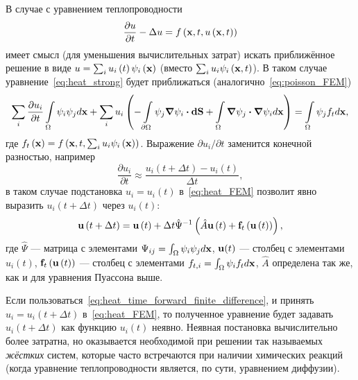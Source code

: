 \documentclass[oneside,final,12pt]{extreport}
\newcommand\bcdot[0]{\boldsymbol\cdot}
\begin{document}
В случае с уравнением теплопроводности
\begin{equation}
  \frac{\partial u}{\partial t} - \Delta u =
    f\left(\vb x, t, u\left(\vb x, t\right)\right)
\label{eq:heat_strong}
\end{equation}
имеет смысл (для уменьшения вычислительных затрат)
искать приближённое решение в виде
$u = \sum_i u_i\left(t\right)\psi_i\left(\vb x\right)$
(вместо $\sum_i u_i\psi_i\left(\vb x, t\right)$).
В таком случае уравнение~\eqref{eq:heat_strong} будет приближаться
(аналогично~\eqref{eq:poisson_FEM})
\begin{equation}
  \sum_i \frac{\partial u_i}{\partial t} \int\limits_\Omega \psi_i\psi_j d\vb x +
    \sum_i u_i \left(
      -\int\limits_{\partial\Omega} \psi_j \grad \psi_i \bcdot \vb{dS} +
      \int\limits_\Omega \grad\psi_j \bcdot \grad \psi_i d\vb x
    \right) =
  \int\limits_\Omega \psi_j f_t d\vb x,
\label{eq:heat_FEM}
\end{equation}
где $f_t\left(\vb x\right) =
  f\left(\vb x, t, \sum_i u_i\psi_i\left(\vb x\right)\right)$.
Выражение $\partial u_i/\partial t$ заменится конечной разностью, например
\begin{equation}
  \frac{\partial u_i}{\partial t} \approx
    \frac{u_i\left(t + \Delta t\right) - u_i\left(t\right)}{\Delta t},
\label{eq:heat_time_forward_finite_difference}
\end{equation}
в таком случае подстановка $u_i = u_i\left(t\right)$ в~\eqref{eq:heat_FEM}
позволит явно выразить $u_i\left(t + \Delta t\right)$ через $u_i\left(t\right)$:
\begin{equation}
  \vb u\left(t + \Delta t\right) =
    \vb u\left(t\right) +
      \Delta t\hat{\Psi}^{-1} \left(\hat{A}\vb u\left(t\right) +
                                    \vb f_t\left(\vb u\left(t\right)\right)\right),
\label{eq:heat_FEM_explicit}
\end{equation}
где $\hat{\Psi}$ --- матрица с элементами $\Psi_{ij} = \int_\Omega\psi_i\psi_j d\vb x$,
$\vb u(t)$ --- столбец с элементами $u_i\left(t\right)$,
$\vb f_t\left(\vb u\left(t\right)\right)$ ---
  столбец с элементами $f_{t,i} = \int_\Omega\psi_i f_t d\vb x$,
$\hat{A}$ определена так же, как и для уравнения Пуассона выше.

Если пользоваться~\eqref{eq:heat_time_forward_finite_difference},
и принять $u_i = u_i(t + \Delta t)$ в~\eqref{eq:heat_FEM},
то полученное уравнение будет задавать
$u_i\left(t + \Delta t\right)$ как функцию $u_i\left(t\right)$ неявно.
Неявная постановка вычислительно более затратна, но
оказывается необходимой при решении так называемых \emph{жёстких} систем\cite{bib:hairer_stiff},
которые часто встречаются при наличии химических реакций
(когда уравнение теплопроводности является, по сути, уравнением диффузии).
\end{document}
